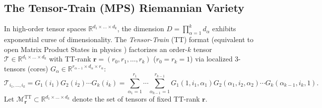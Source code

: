 \documentclass[11pt,a4paper,reqno]{amsart}
\theoremstyle{definition}
\numberwithin{equation}{section}
\newcommand{\R}{\mathbb{R}}
\begin{document}
\subsection{The Tensor-Train (MPS) Riemannian Variety}
\label{subsec:tensor_train_manifold}
In high-order tensor spaces $\R^{d_1 \times \dots \times d_k}$, the dimension $D = \prod_{\alpha=1}^k d_\alpha$ exhibits exponential curse of dimensionality. The \emph{Tensor-Train} (TT) format (equivalent to open Matrix Product States in physics \cite{verstraete2010continuous}) factorizes an order-$k$ tensor $\mathcal{T} \in \R^{d_1 \times \dots \times d_k}$ with TT-rank $\mathbf{r} = (r_0, r_1, \dots, r_k)$ ($r_0 = r_k = 1$) via localized 3-tensors (cores) $G_\alpha \in \R^{r_{\alpha-1} \times d_\alpha \times r_\alpha}$:
\begin{equation}
    \label{eq:tt_decomposition}
    \mathcal{T}_{i_1, \dots, i_k} = G_1(i_1) G_2(i_2) \cdots G_k(i_k) = \sum_{\alpha_1=1}^{r_1} \cdots \sum_{\alpha_{k-1}=1}^{r_{k-1}} G_1(1, i_1, \alpha_1) G_2(\alpha_1, i_2, \alpha_2) \cdots G_k(\alpha_{k-1}, i_k, 1).
\end{equation}
Let $\mathcal{M}_{\mathbf{r}}^{\mathrm{TT}} \subset \R^{d_1 \times \dots \times d_k}$ denote the set of tensors of fixed TT-rank $\mathbf{r}$.
\end{document}
